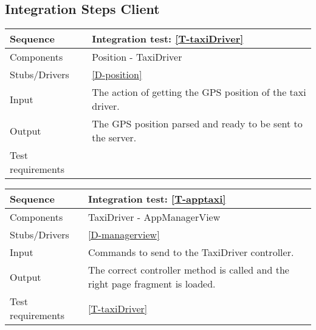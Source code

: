 \subsection{Integration Steps Client}

\begin{table}[H]
    \begin{tabularx}{\textwidth}{l|X}
        \hline
        Sequence
        & 
        Integration test: \ref{T-taxiDriver}
        \\ \hline
        Components 
        & 
        Position - TaxiDriver
        \\ \hline
        Stubs/Drivers 
        & 
        \ref{D-position}
        \\ \hline
        Input 
        & 
        The action of getting the GPS position of the taxi driver.
        \\ \hline
        Output 
        & 
        The GPS position parsed and ready to be sent to the server.
        \\ \hline
        Test requirements 
        & 
        
        \\ \hline
    \end{tabularx}
\end{table}

\begin{table}[H]
    \begin{tabularx}{\textwidth}{l|X}
        \hline
        Sequence
        & 
        Integration test: \ref{T-apptaxi}
        \\ \hline
        Components 
        & 
        TaxiDriver - AppManagerView
        \\ \hline
        Stubs/Drivers 
        & 
        \ref{D-managerview}
        \\ \hline
        Input 
        & 
        Commands to send to the TaxiDriver controller.
        \\ \hline
        Output 
        & 
        The correct controller method is called and the right page fragment is loaded.
        \\ \hline
        Test requirements 
        & 
        \ref{T-taxiDriver}
        \\ \hline
    \end{tabularx}
\end{table}

